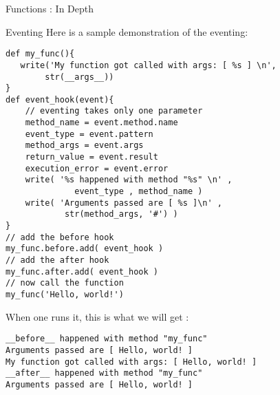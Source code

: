 \begin{section}{Functions : In Depth}
\begin{subsection}{Eventing}
Here is a sample demonstration of the eventing:
 
\begin{center}\begin{minipage}{\linewidth}
\begin{lstlisting}[style=JexlStyle]
def my_func(){
   write('My function got called with args: [ %s ] \n', 
        str(__args__))
}
def event_hook(event){  
    // eventing takes only one parameter  
    method_name = event.method.name 
    event_type = event.pattern
    method_args = event.args 
    return_value = event.result
    execution_error = event.error 
    write( '%s happened with method "%s" \n' , 
              event_type , method_name )
    write( 'Arguments passed are [ %s ]\n' , 
            str(method_args, '#') )
}
// add the before hook 
my_func.before.add( event_hook )
// add the after hook 
my_func.after.add( event_hook )
// now call the function 
my_func('Hello, world!')
\end{lstlisting}
\end{minipage}\end{center}

When one runs it, this is what we will get :

\begin{lstlisting}[style=all]
__before__ happened with method "my_func" 
Arguments passed are [ Hello, world! ]
My function got called with args: [ Hello, world! ] 
__after__ happened with method "my_func" 
Arguments passed are [ Hello, world! ]
\end{lstlisting}

\end{subsection}


\end{section}

